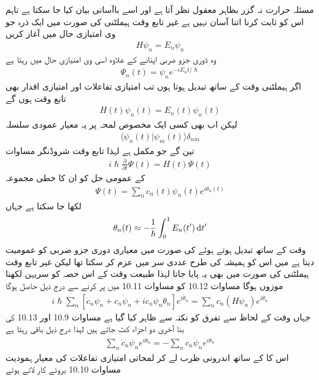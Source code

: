 مسئلہ حرارت نہ گزر بظاہر معقول نظر آتا ہے اور اسے باآسانی بیان کیا جا سکتا ہے تاہم اس کو ثابت کرنا اتنا آسان نہیں ہے غیر تابع وقت ہيملٹنی کی صورت میں ایک ذرہ جو  وی امتیازی حال  میں آغاز کریں 
\begin{align}
H \psi_n = E_n \psi_n
\end{align}
 وہ ڈوری جزو ضربی اپنانے کے علاوہ اسی  وی امتیازی حال میں رہتا ہے 
\begin{align}
\Psi_n (t) = \psi_n e^{-i E_n t/ \hslash}
\end{align}
اگر ہيملٹنی وقت کے ساتھ تبدیل ہوتا ہوں تب امتیازی تفاعلات اور امتیازی اقدار بھی تابع وقت ہوں گے 
\begin{align}
H(t) \psi_n (t) = E_n (t) \psi_n (t)
\end{align}
لیکن اب بھی کسی ایک مخصوص لمحہ پر یہ معیار عمودی سلسلہ 
\begin{align}
\langle \psi_n (t) | \psi_m (t) \rangle \delta_{nm} 
\end{align}
تین گے جو مکمل ہے لہذا تابع وقت شروڈنگر مساوات 
\begin{align}
i \hslash \frac{\partial}{\partial t} \Psi (t) = H (t) \Psi (t)
\end{align}
کے عمومی حل کو ان کا خطی مجموعہ 
\begin{align}
\Psi (t) = \sum_n c_n (t) \psi_n (t) e^{i \theta_n (t)}
\end{align}
لکھا جا سکتا ہے جہاں 
\begin{align}
\theta_n (t) \approx - \frac{1}{\hslash} \int_0^1 E_n (t') \dif t'
\end{align}
وقت کے ساتھ تبدیل ہوتے ہوئے  کی صورت میں معیاری دوری جزو ضربی کو عمومیت دیتا ہے میں اس کو ہمیشہ کی طرح عددی سر  میں عزم کر سکتا تھا لیکن غیر تابع وقت ہيملٹنی کی صورت میں بھی یہ پایا جاتا لہذا طبیعت وقت کے اس حصہ کو سریہن لکھنا موزوں ہوگا مساوات 10.12 کو مساوات 10.11 میں پر کرنے سے درج ذیل حاصل ہوگا 
\begin{align}
i \hslash \sum_n [\dot{c}_n \psi_n + c_n \dot{\psi}_n + i c_n \psi_n \theta_n] e^{i \dot{\theta}_n} = \sum_n c_n (H \psi_n) e^{i \theta_n} 
\end{align}
جہاں وقت کے لحاظ سے تفرق کو نکتہ سے ظاہر کیا گیا ہے مساوات 10.9 اور 10.13 کی بنا آخری دو اجزاء کٹ جاتے ہیں لہذا درج ذیل باقی رہتا ہے 
\begin{align}
\sum_n \dot{c}_n \psi_n e^{i \theta_n} = - \sum_n c_n \dot{\psi}_n e^{i \theta_n}
\end{align}
اس کا  کے ساتھ اندرونی ظرب لے کر لمحاتی امتیازی تفاعلات کی معیار ہمودیت مساوات 10.10 بروئے کار لاتے ہوئے 
